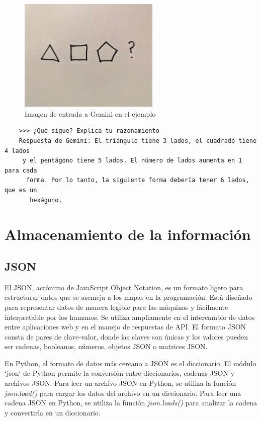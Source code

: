 \begin{figure}[h]
	\centering
	\includegraphics[width=0.6\textwidth]{Imagenes/ImagenesGemini/gemini-10}
	\caption{Imagen de entrada a Gemini en el ejemplo}
	\label{fig:gemini-10}
\end{figure}
\begin{verbatim}
	>>> ¿Qué sigue? Explica tu razonamiento
	Respuesta de Gemini: El triángulo tiene 3 lados, el cuadrado tiene 4 lados
	 y el pentágono tiene 5 lados. El número de lados aumenta en 1 para cada
	  forma. Por lo tanto, la siguiente forma debería tener 6 lados, que es un
	   hexágono.
\end{verbatim}

\section{Almacenamiento de la información}	
\subsection{JSON}
El JSON, acrónimo de JavaScript Object Notation, es un formato ligero para estructurar datos que se asemeja a los mapas en la programación. Está diseñado para representar datos de manera legible para las máquinas y fácilmente interpretable por los humanos. Se utiliza ampliamente en el intercambio de datos entre aplicaciones web y en el manejo de respuestas de API. El formato JSON consta de pares de clave-valor, donde las claves son únicas y los valores pueden ser cadenas, booleanos, números, objetos JSON o matrices JSON.

En Python, el formato de datos más cercano a JSON es el diccionario. El módulo `json` de Python permite la conversión entre diccionarios, cadenas JSON y archivos JSON. Para leer un archivo JSON en Python, se utiliza la función \textit{json.load()} para cargar los datos del archivo en un diccionario. Para leer una cadena JSON en Python, se utiliza la función  \textit{json.loads()} para analizar la cadena y convertirla en un diccionario.

